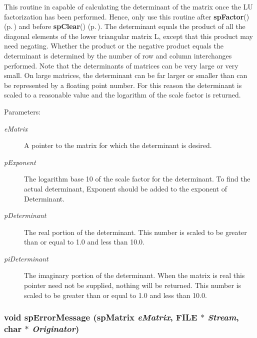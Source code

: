 This routine in capable of calculating the determinant of the matrix once the LU factorization has been performed. Hence, only use this routine after {\bf sp\-Factor}() {\rm (p.\,\pageref{spFactor_8c_a25})} and before {\bf sp\-Clear}() {\rm (p.\,\pageref{spBuild_8c_a10})}. The determinant equals the product of all the diagonal elements of the lower triangular matrix L, except that this product may need negating. Whether the product or the negative product equals the determinant is determined by the number of row and column interchanges performed. Note that the determinants of matrices can be very large or very small. On large matrices, the determinant can be far larger or smaller than can be represented by a floating point number. For this reason the determinant is scaled to a reasonable value and the logarithm of the scale factor is returned.\begin{Desc}
\item[Parameters: ]\par
\begin{description}
\item[{\em 
e\-Matrix}]A pointer to the matrix for which the determinant is desired. \item[{\em 
p\-Exponent}]The logarithm base 10 of the scale factor for the determinant. To find the actual determinant, Exponent should be added to the exponent of Determinant. \item[{\em 
p\-Determinant}]The real portion of the determinant. This number is scaled to be greater than or equal to 1.0 and less than 10.0. \item[{\em 
pi\-Determinant}]The imaginary portion of the determinant. When the matrix is real this pointer need not be supplied, nothing will be returned. This number is scaled to be greater than or equal to 1.0 and less than 10.0. \end{description}
\end{Desc}
\subsubsection{\setlength{\rightskip}{0pt plus 5cm}void sp\-Error\-Message ({\bf sp\-Matrix} {\em e\-Matrix}, FILE $\ast$ {\em Stream}, char $\ast$ {\em Originator})}\label{spUtils_8c_a24}



